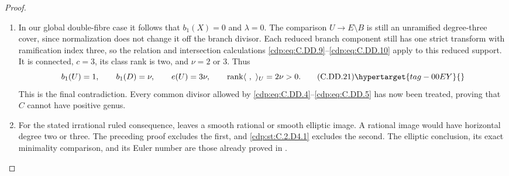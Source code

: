 \begin{proof}
\begin{enumerate}[label={$\langle1\rangle$\arabic*.},leftmargin=*]
\item In our global double-fibre case it follows that
$b_1(X)=0$ and $\lambda=0$.
The comparison $U\to E\setminus B$ is still an
unramified degree-three cover, since normalization
does not change it off the branch divisor.
Each reduced branch component still has one
strict transform with ramification index three,
so the relation and intersection calculations
\eqref{cdp:eq:C.DD.9}--\eqref{cdp:eq:C.DD.10} apply to this reduced support.
It is connected, $c=3$, its class rank is two,
and $\nu=2$ or $3$. Thus
\[
 b_1(U)=1,\qquad b_1(D)=\nu,\qquad e(U)=3\nu,
 \qquad\operatorname{rank}\langle\ ,\ \rangle_U
                                      =2\nu>0.
\tag{C.DD.21}\hypertarget{tag-00EY}{}\label{cdp:eq:C.DD.21}
\]
This is the final contradiction. Every common
divisor allowed by \eqref{cdp:eq:C.DD.4}--\eqref{cdp:eq:C.DD.5} has now
been treated, proving that $C$ cannot have
positive genus.

\item For the stated irrational ruled consequence,
 leaves a smooth rational or smooth elliptic
image. A rational image would have horizontal
degree two or three. The preceding proof excludes
the first, and \ref{cdp:st:C.2.D4.1} excludes the second.
The elliptic conclusion, its exact minimality
comparison, and its Euler number are those already
proved in .

\end{enumerate}
\end{proof}
